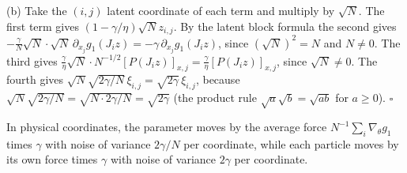 \documentclass[11pt,a4paper]{report}
\begin{document}
(b) Take the \((i,j)\) latent coordinate of each term and multiply by \(\sqrt N\). The first term gives \((1-\gamma/\eta)\sqrt Nz_{i,j}\). By the latent block formula the second gives \(-\frac\gamma N\sqrt N\cdot\sqrt N\,\partial_{x_j}g_1(J_iz)=-\gamma\,\partial_{x_j}g_1(J_iz)\), since \((\sqrt N)^2=N\) and \(N\ne0\). The third gives \(\frac\gamma\eta\sqrt N\cdot N^{-1/2}[P(J_iz)]_{x,j}=\frac\gamma\eta[P(J_iz)]_{x,j}\), since \(\sqrt N\ne0\). The fourth gives \(\sqrt N\sqrt{2\gamma/N}\,\xi_{i,j}=\sqrt{2\gamma}\,\xi_{i,j}\), because \(\sqrt N\sqrt{2\gamma/N}=\sqrt{N\cdot2\gamma/N}=\sqrt{2\gamma}\) (the product rule \(\sqrt a\sqrt b=\sqrt{ab}\) for \(a\ge0\)). \(\square\)




In physical coordinates, the parameter moves by the average force \(N^{-1}\sum_i\nabla_\theta g_1\) times \(\gamma\) with noise of variance \(2\gamma/N\) per coordinate, while each particle moves by its own force times \(\gamma\) with noise of variance \(2\gamma\) per coordinate.
\end{document}
